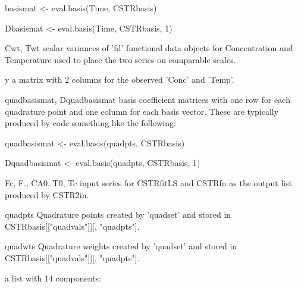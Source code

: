 \begin{Arguments}
\begin{ldescription}
{basismat <- eval.basis(Time, CSTRbasis)

Dbasismat <- eval.basis(Time, CSTRbasis, 1)
    
\item[Cwt, Twt] scalar variances of 'fd' functional data objects for
Concentration and Temperature used to place the two series on
comparable scales.   


\item[y] a matrix with 2 columns for the observed 'Conc' and 'Temp'.

\item[quadbasismat, Dquadbasismat] basis coefficient matrices with one row for each quadrature
point and one column for each basis vector.  These are typically
produced by code something like the following:  

quadbasismat <- eval.basis(quadpts, CSTRbasis) 

Dquadbasismat <- eval.basis(quadpts, CSTRbasis, 1)


\item[Fc, F., CA0, T0, Tc] input series for CSTRfitLS and CSTRfn as the output list
produced by CSTR2in.


\item[quadpts] Quadrature points created by 'quadset' and stored in
CSTRbasis[["quadvals"]][, "quadpts"].   

\item[quadwts] Quadrature weights created by 'quadset' and stored in
CSTRbasis[["quadvals"]][, "quadpts"].  

}

\item[\code{fitstruct}] a list with 14 components:  

\end{ldescription}
\end{Arguments}

